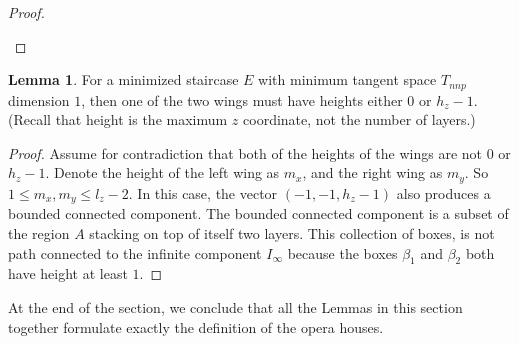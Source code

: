 \documentclass{amsart}[10pt]
\theoremstyle{plain}
\theoremstyle{definition}
\newtheorem{lemma}[theorem]{Lemma}
\begin{document}
\begin{proof}
\begin{enumerate}


\end{enumerate}


\end{proof}

\begin{lemma}
\label{height_of_wings}
For a minimized staircase $E$ with minimum tangent space $T_{nnp}$ dimension $1$, then one of the two wings must have heights either $0$ or $h_z-1$. (Recall that height is the maximum $z$ coordinate, not the number of layers.)
\end{lemma}

\begin{proof}
Assume for contradiction that both of the heights of the wings are not $0$ or $h_z-1$. Denote the height of the left wing as $m_x$, and the right wing as $m_y$. So $1 \leq m_x,m_y \leq l_z-2$. In this case, the vector $(-1,-1,h_z-1)$ also produces a bounded connected component. The bounded connected component is a subset of the region $A$ stacking on top of itself two layers. This collection of boxes, is not path connected to the infinite component $I_{\infty}$ because the boxes $\beta_1$ and $\beta_2$ both have height at least $1$.\end{proof}

At the end of the section, we conclude that all the Lemmas in this section together formulate exactly the definition of the opera houses. 
\end{document}
